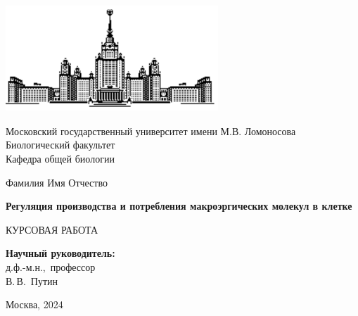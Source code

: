\begin{titlepage}
    \begin{center}
        \includegraphics[width=8cm, height=4cm]{pic/msu.eps}
    \end{center}
    
    \begin{center}
        Московский государственный университет имени М.В. Ломоносова\\
        \vspace{0.1 cm}
        Биологический факультет\\
        \vspace{0.1 cm}
        Кафедра общей биологии
        
        \vspace{3cm}
        {\Large Фамилия Имя Отчество}\\
        \vspace{1cm}
        
        {\bf\LARGE Регуляция производства и потребления макроэргических молекул в клетке}\\ \vspace{2cm}
        
    КУРСОВАЯ РАБОТА
    
    \end{center}
    
\vspace{2cm}

\begin{flushright}
    {\bf Научный руководитель:}\\
    д.ф.-м.н.,~профессор\\ 
    В.\,В.~Путин
\end{flushright}

\vfill

\centerline {Москва, 2024}

\end{titlepage}
